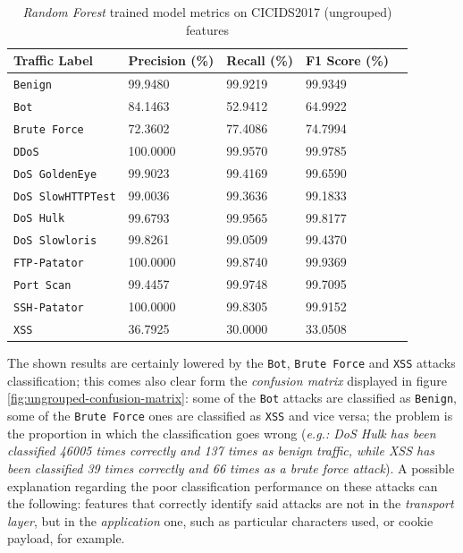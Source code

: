 \begin{table}[h!]
   \centering
   \begin{tabular}{l|llll}
       \toprule 
       Traffic Label & Precision (\%) & Recall (\%) & F1 Score (\%) \\
       \midrule
       \rowcolor{black!10} \texttt{Benign} & 99.9480 & 99.9219 & 99.9349 \\
       \texttt{Bot} & 84.1463 & 52.9412 & 64.9922 \\
       \rowcolor{black!10} \texttt{Brute Force} & 72.3602 & 77.4086 & 74.7994 \\
       \texttt{DDoS} & 100.0000 & 99.9570 & 99.9785 \\
       \rowcolor{black!10} \texttt{DoS GoldenEye} & 99.9023 & 99.4169 & 99.6590 \\
       \texttt{DoS SlowHTTPTest} & 99.0036 & 99.3636 & 99.1833 \\
       \rowcolor{black!10} \texttt{DoS Hulk} & 99.6793 & 99.9565 & 99.8177 \\
       \texttt{DoS Slowloris} & 99.8261 & 99.0509 & 99.4370 \\
       \rowcolor{black!10} \texttt{FTP-Patator} & 100.0000 & 99.8740 & 99.9369 \\
       \texttt{Port Scan} & 99.4457 & 99.9748 & 99.7095 \\
       \rowcolor{black!10} \texttt{SSH-Patator} & 100.0000 & 99.8305 & 99.9152 \\
       \texttt{XSS} & 36.7925 & 30.0000 & 33.0508 \\
       \bottomrule
   \end{tabular}
   \caption{\textit{Random Forest} trained model metrics on CICIDS2017 (ungrouped) features}
   \label{tab:ungrouped-metrics}
\end{table}

The shown results are certainly lowered by the \texttt{Bot}, \texttt{Brute Force} and \texttt{XSS} attacks classification; this comes also clear form the \textit{confusion matrix} displayed in figure \ref{fig:ungrouped-confusion-matrix}: some of the \texttt{Bot} attacks are classified as \texttt{Benign}, some of the \texttt{Brute Force} ones are classified as \texttt{XSS} and vice versa; the problem is the proportion in which the classification goes wrong (\textit{e.g.: DoS Hulk has been classified 46005 times correctly and 137 times as benign traffic, while XSS has been classified 39 times correctly and 66 times as a brute force attack}). A possible explanation regarding the poor classification performance on these attacks can the following: features that correctly identify said attacks are not in the \textit{transport layer}, but in the \textit{application} one, such as particular characters used, or cookie payload, for example.

